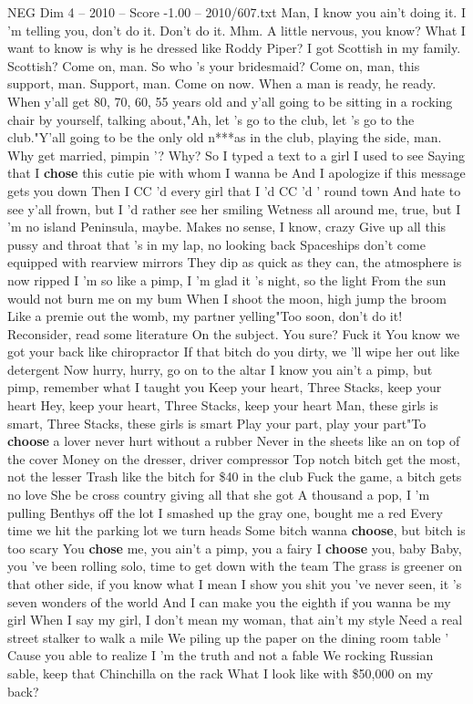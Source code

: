 \begin{textsample}{NEG Dim 4 – 2010 – Score -1.00 – 2010/607.txt}  \label{ex:f4_neg_009}
Man, I know you ain't doing it.
I 'm telling you, don't do it.
Don't do it.
Mhm.
A little nervous, you know?
What I want to know is why is he dressed like Roddy Piper?
I got Scottish in my family.
Scottish?
Come on, man.
So who 's your bridesmaid?
Come on, man, this support, man.
Support, man.
Come on now.
When a man is ready, he ready.
When y'all get 80, 70, 60, 55 years old and y'all going to be sitting in a rocking chair by yourself, talking about,"Ah, let 's go to the club, let 's go to the club."Y'all going to be the only old n***as in the club, playing the side, man.
Why get married, pimpin '?
Why?
So I typed a text to a girl I used to see Saying that I \textbf{chose} this cutie pie with whom I wanna be And I apologize if this message gets you down Then I CC 'd every girl that I 'd CC 'd ' round town And hate to see y'all frown, but I 'd rather see her smiling Wetness all around me, true, but I 'm no island Peninsula, maybe.
Makes no sense, I know, crazy Give up all this pussy and throat that 's in my lap, no looking back Spaceships don't come equipped with rearview mirrors They dip as quick as they can, the atmosphere is now ripped I 'm so like a pimp, I 'm glad it 's night, so the light From the sun would not burn me on my bum When I shoot the moon, high jump the broom Like a premie out the womb, my partner yelling"Too soon, don't do it!
Reconsider, read some literature On the subject.
You sure?
Fuck it You know we got your back like chiropractor If that bitch do you dirty, we 'll wipe her out like detergent Now hurry, hurry, go on to the altar I know you ain't a pimp, but pimp, remember what I taught you Keep your heart, Three Stacks, keep your heart Hey, keep your heart, Three Stacks, keep your heart Man, these girls is smart, Three Stacks, these girls is smart Play your part, play your part"To \textbf{choose} a lover never hurt without a rubber Never in the sheets like an on top of the cover Money on the dresser, driver compressor Top notch bitch get the most, not the lesser Trash like the bitch for \$40 in the club Fuck the game, a bitch gets no love She be cross country giving all that she got A thousand a pop, I 'm pulling Benthys off the lot I smashed up the gray one, bought me a red Every time we hit the parking lot we turn heads Some bitch wanna \textbf{choose}, but bitch is too scary You \textbf{chose} me, you ain't a pimp, you a fairy I \textbf{choose} you, baby Baby, you 've been rolling solo, time to get down with the team The grass is greener on that other side, if you know what I mean I show you shit you 've never seen, it 's seven wonders of the world And I can make you the eighth if you wanna be my girl When I say my girl, I don't mean my woman, that ain't my style Need a real street stalker to walk a mile We piling up the paper on the dining room table ' Cause you able to realize I 'm the truth and not a fable We rocking Russian sable, keep that Chinchilla on the rack What I look like with \$50,000 on my back?

\end{textsample}
